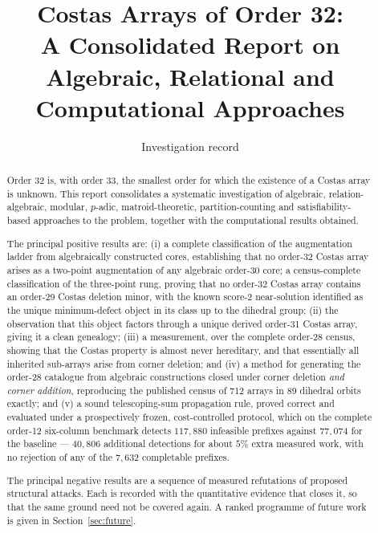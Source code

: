 \documentclass[11pt,a4paper]{article}
\title{\Large Costas Arrays of Order 32:\\
A Consolidated Report on Algebraic, Relational and Computational Approaches}
\author{Investigation record}
\date{}
\theoremstyle{definition}
\begin{document}
\maketitle

\begin{abstract}
\noindent
Order 32 is, with order 33, the smallest order for which the existence of a
Costas array is unknown. This report consolidates a systematic investigation of
algebraic, relation-algebraic, modular, $p$-adic, matroid-theoretic,
partition-counting and satisfiability-based approaches to the problem, together
with the computational results obtained.

The principal positive results are: (i) a complete classification of the
augmentation ladder from algebraically constructed cores, establishing that no
order-32 Costas array arises as a two-point augmentation of any algebraic
order-30 core; a census-complete classification of the three-point rung, proving that no order-32 Costas array contains an order-29 Costas deletion minor,
with the known score-2 near-solution identified as the unique minimum-defect
object in its class up to the dihedral group; (ii) the observation that this
object factors through a unique derived order-31 Costas array, giving it a clean
genealogy; (iii) a measurement, over the complete order-28 census, showing that
the Costas property is almost never hereditary, and that essentially all
inherited sub-arrays arise from corner deletion; and (iv) a method for
generating the order-28 catalogue from algebraic constructions closed under
corner deletion \emph{and corner addition}, reproducing the published census of
712 arrays in 89 dihedral orbits exactly; and (v) a sound telescoping-sum
propagation rule, proved correct and evaluated under a prospectively frozen,
cost-controlled protocol, which on the complete order-12 six-column benchmark
detects $117{,}880$ infeasible prefixes against $77{,}074$ for the baseline ---
$40{,}806$ additional detections for about $5\%$ extra measured work, with no
rejection of any of the $7{,}632$ completable prefixes.

The principal negative results are a sequence of measured refutations of
proposed structural attacks. Each is recorded with the quantitative evidence
that closes it, so that the same ground need not be covered again. A ranked
programme of future work is given in Section~\ref{sec:future}.
\end{abstract}

\tableofcontents
\newpage

\end{document}
